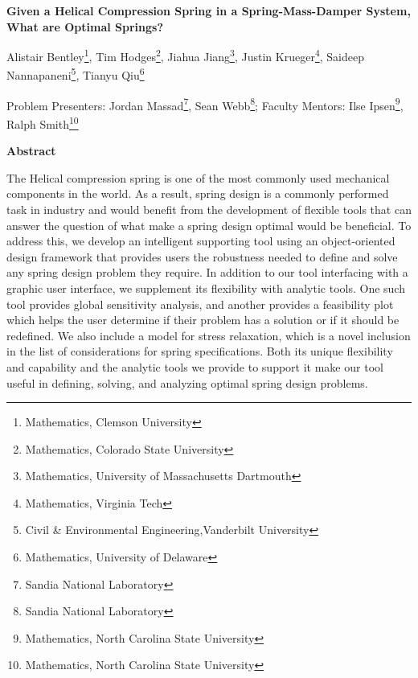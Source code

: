 \documentclass[10pt]{article}
\begin{document}
\centerline{\large \bf Given a Helical Compression Spring in a Spring-Mass-Damper System, What are Optimal Springs?}

\vspace{.1truein}

\def\thefootnote{\arabic{footnote}}
\begin{center}
  
  Alistair Bentley\footnote{Mathematics, Clemson University},
   Tim Hodges\footnote{Mathematics, Colorado State University},
   Jiahua Jiang\footnote{Mathematics, University of Massachusetts Dartmouth },
  Justin Krueger\footnote{Mathematics, Virginia Tech},
  Saideep Nannapaneni\footnote{Civil \& Environmental Engineering,Vanderbilt University},
  Tianyu Qiu\footnote{Mathematics, University of Delaware}
   
\end{center}



\begin{center}
Problem Presenters: Jordan Massad\footnote{Sandia National Laboratory},
Sean Webb\footnote{Sandia National Laboratory};
	Faculty Mentors: Ilse Ipsen\footnote{Mathematics, North Carolina State University},
	Ralph Smith\footnote{Mathematics, North Carolina State University} 
\end{center}

\vspace{.3truein}
\centerline{\bf Abstract}

The Helical compression spring is one of the most commonly used mechanical components in the world. As a result, spring design is a commonly performed task in industry and would benefit from the development of flexible tools that can answer the question of what make a spring design optimal would be beneficial. To address this, we develop an intelligent supporting tool using an object-oriented design framework that provides users the robustness needed to define and solve any spring design problem they require. In addition to our tool interfacing with a graphic user interface, we supplement its flexibility with analytic tools. One such tool provides global sensitivity analysis, and another provides a feasibility plot which helps the user determine if their problem has a solution or if it should be redefined. We also include a model for stress relaxation, which is a novel inclusion in the list of considerations for spring specifications. Both its unique flexibility and capability and the analytic tools we provide to support it make our tool useful in defining, solving, and analyzing optimal spring design problems. 
\end{document}
